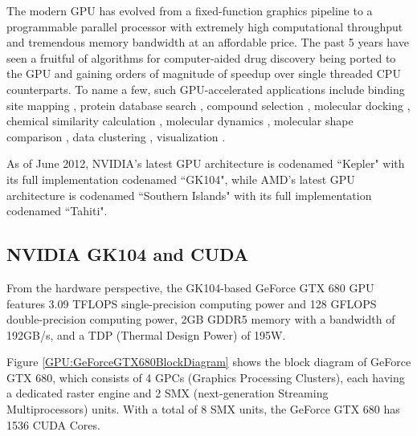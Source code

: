 The modern GPU has evolved from a fixed-function graphics pipeline to a programmable parallel processor with extremely high computational throughput and tremendous memory bandwidth at an affordable price. The past 5 years have seen a fruitful of algorithms for computer-aided drug discovery being ported to the GPU and gaining orders of magnitude of speedup over single threaded CPU counterparts. To name a few, such GPU-accelerated applications include binding site mapping \citep{722}, protein database search \citep{189}, compound selection \citep{750}, molecular docking \citep{723,652,779,969}, chemical similarity calculation \citep{726,881}, molecular dynamics \citep{373,374}, molecular shape comparison \citep{491}, data clustering \citep{932}, visualization \citep{986}.

As of June 2012, NVIDIA’s latest GPU architecture is codenamed ``Kepler" with its full implementation codenamed ``GK104", while AMD's latest GPU architecture is codenamed ``Southern Islands" with its full implementation codenamed ``Tahiti".

\subsection{NVIDIA GK104 and CUDA}

From the hardware perspective, the GK104-based GeForce GTX 680 GPU features 3.09 TFLOPS single-precision computing power and 128 GFLOPS double-precision computing power, 2GB GDDR5 memory with a bandwidth of 192GB/s, and a TDP (Thermal Design Power) of 195W.

Figure \ref{GPU:GeForceGTX680BlockDiagram} shows the block diagram of GeForce GTX 680, which consists of 4 GPCs (Graphics Processing Clusters), each having a dedicated raster engine and 2 SMX (next-generation Streaming Multiprocessors) units. With a total of 8 SMX units, the GeForce GTX 680 has 1536 CUDA Cores.

